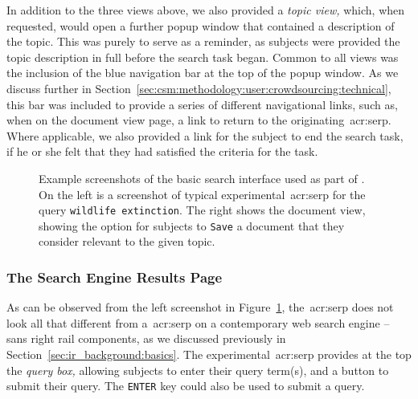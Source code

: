 In addition to the three views above, we also provided a \emph{topic view,} which, when requested, would open a further popup window that contained a description of the topic. This was purely to serve as a reminder, as subjects were provided the topic description in full before the search task began. Common to all views was the inclusion of the blue navigation bar at the top of the popup window. As we discuss further in Section~\ref{sec:csm:methodology:user:crowdsourcing:technical}, this bar was included to provide a series of different navigational links, such as, when on the document view page, a link to return to the originating~\gls{acr:serp}. Where applicable, we also provided a link for the subject to end the search task, if he or she felt that they had satisfied the criteria for the task.

\begin{figure}[t!]
    \centering
    \caption[Example screenshots of the experimental interfaces]{Example screenshots of the basic search interface used as part of \treconomics. On the left is a screenshot of typical experimental~\gls{acr:serp} for the query \texttt{wildlife extinction}. The right shows the document view, showing the option for subjects to \texttt{Save} a document that they consider relevant to the given topic.}
    \label{fig:interfaces}
\end{figure}

\subsubsection{The Search Engine Results Page}
As can be observed from the left screenshot in Figure~\ref{fig:interfaces}, the~\gls{acr:serp} does not look all that different from a~\gls{acr:serp} on a contemporary web search engine -- sans right rail components, as we discussed previously in Section~\ref{sec:ir_background:basics}. The experimental~\gls{acr:serp} provides at the top the \emph{query box,} allowing subjects to enter their query term(s), and a button to submit their query. The \texttt{ENTER} key could also be used to submit a query.

